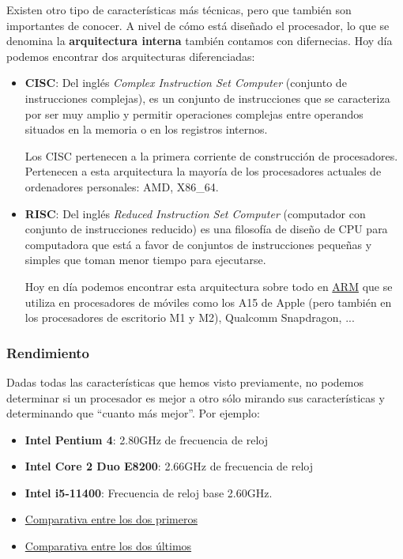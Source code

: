 Existen otro tipo de características más técnicas, pero que también son importantes de conocer. A nivel de cómo está diseñado el procesador, lo que se denomina la \textbf{arquitectura interna} también contamos con difernecias. Hoy día podemos encontrar dos arquitecturas diferenciadas:
\begin{itemize}
    \item \textbf{CISC}: Del inglés \textit{Complex Instruction Set Computer} (conjunto de instrucciones complejas), es un conjunto de instrucciones  que se caracteriza por ser muy amplio y permitir operaciones complejas entre operandos situados en la memoria o en los registros internos.

    Los CISC pertenecen a la primera corriente de construcción de procesadores. Pertenecen a esta arquitectura la mayoría de los procesadores actuales de ordenadores personales: AMD, X86\_64.

    \item \textbf{RISC}: Del inglés \textit{Reduced Instruction Set Computer} (computador con conjunto de instrucciones reducido) es una filosofía de diseño de CPU para computadora que está a favor de conjuntos de instrucciones pequeñas y simples que toman menor tiempo para ejecutarse.

    Hoy en día podemos encontrar esta arquitectura sobre todo en \href{https://es.wikipedia.org/wiki/Arquitectura_ARM}{ARM} que se utiliza en procesadores de móviles como los A15 de Apple (pero también en los procesadores de escritorio M1 y M2), Qualcomm Snapdragon, ...

\end{itemize}



\subsubsection{Rendimiento}
Dadas todas las características que hemos visto previamente, no podemos determinar si un procesador es mejor a otro sólo mirando sus características y determinando que “cuanto más mejor”. Por ejemplo:

\begin{itemize}
    \item \textbf{Intel Pentium 4}: 2.80GHz de frecuencia de reloj
    \item \textbf{Intel Core 2 Duo E8200}: 2.66GHz de frecuencia de reloj
    \item \textbf{Intel i5-11400}: Frecuencia de reloj base 2.60GHz.
    \item \href{https://cpu.userbenchmark.com/Compare/Intel-Pentium-4-280GHz-vs-Intel-Core2-Duo-E8200/m3163vsm3200}{Comparativa entre los dos primeros}
    \item \href{https://cpu.userbenchmark.com/Compare/Intel-Core-i5-11400-vs-Intel-Core2-Duo-E8200/4112vsm3200}{Comparativa entre los dos últimos}
\end{itemize}

